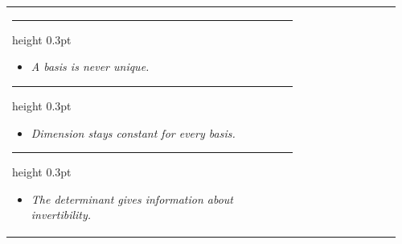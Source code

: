\documentclass[10pt,a4paper]{article}
\begin{document}
\begin{tabular}{p{0.72\linewidth}|p{0.24\linewidth}}
\begin{minipage}[t]{\linewidth}
\vspace{2mm}

\hrule height 0.3pt

\vspace{3mm}



\begin{itemize}

\item \textit{A basis is never unique.}

\end{itemize}



\vspace{2mm}

\hrule height 0.3pt

\vspace{3mm}



\begin{itemize}

\item \textit{Dimension stays constant for every basis.}

\end{itemize}



\vspace{2mm}

\hrule height 0.3pt

\vspace{3mm}



\begin{itemize}

\item \textit{The determinant gives information about invertibility.}

\end{itemize}



\end{minipage}


\end{tabular}
\end{document}
